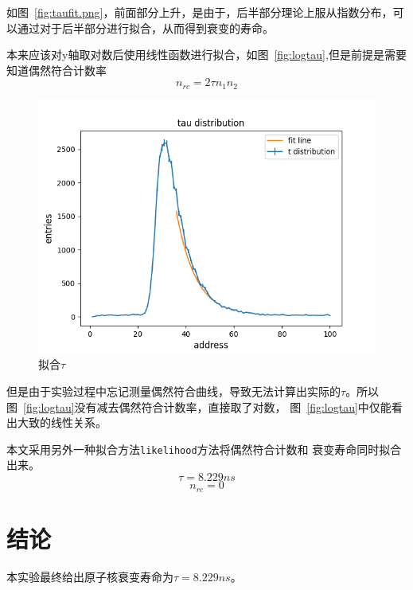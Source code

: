 \documentclass[12pt]{ctexart}
\begin{document}
如图~\ref{fig:taufit.png}，前面部分上升，是由于，后半部分理论上服从指数分布，可以通过对于后半部分进行拟合，从而得到衰变的寿命。

本来应该对y轴取对数后使用线性函数进行拟合，如图~\ref{fig:logtau},但是前提是需要知道偶然符合计数率
\[n_{rc}=2\tau n_1n_2\]
\begin{figure}
    \centering
    \includegraphics[width=\textwidth]{data/tau.png}
    \caption{拟合$\tau$}
    \label{fig:taufit}
\end{figure}
但是由于实验过程中忘记测量偶然符合曲线，导致无法计算出实际的$\tau$。所以图~\ref{fig:logtau}没有减去偶然符合计数率，直接取了对数，
图~\ref{fig:logtau}中仅能看出大致的线性关系。

本文采用另外一种拟合方法\texttt{likelihood}方法将偶然符合计数和
衰变寿命同时拟合出来。
\[\tau=8.229ns\]
\[n_{rc}=0\]
\section{结论}
本实验最终给出原子核衰变寿命为$\tau=8.229ns$。

\end{document}
